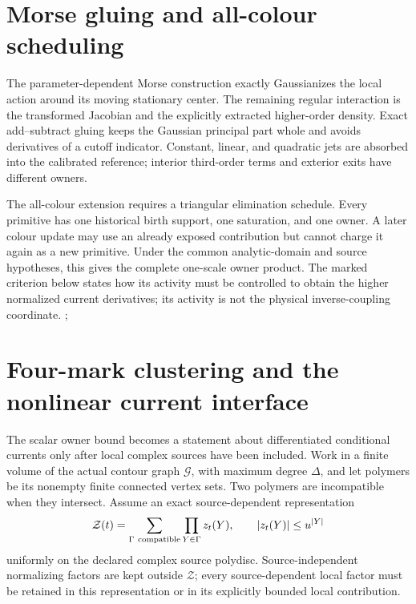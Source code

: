 \documentclass[11pt,oneside,openany]{book}
\theoremstyle{definition}
\theoremstyle{remark}
\newcommand{\src}[2]{\cite[#2]{#1}}
\begin{document}
\section{Morse gluing and all-colour scheduling}
The parameter-dependent Morse construction exactly Gaussianizes the local action around its moving stationary center. The remaining regular interaction is the transformed Jacobian and the explicitly extracted higher-order density. Exact add--subtract gluing keeps the Gaussian principal part whole and avoids derivatives of a cutoff indicator. Constant, linear, and quadratic jets are absorbed into the calibrated reference; interior third-order terms and exterior exits have different owners.

The all-colour extension requires a triangular elimination schedule.
Every primitive has one historical birth support, one saturation, and
one owner. A later colour update may use an already exposed contribution
but cannot charge it again as a new primitive. Under the common
analytic-domain and source hypotheses, this gives the complete one-scale
owner product. The marked criterion below states how its activity must
be controlled to obtain the higher normalized current derivatives; its
activity is not the physical inverse-coupling coordinate.
\src{F8}{V61--V65}; \src{F9}{V5--V8}

\section{Four-mark clustering and the nonlinear current interface}
\label{sec:four-mark-interface}
The scalar owner bound becomes a statement about differentiated
conditional currents only after local complex sources have been
included. Work in a finite volume of the actual contour graph
$\mathcal G$, with maximum degree $\Delta$, and let polymers be its nonempty finite connected
vertex sets. Two polymers are incompatible when they intersect. Assume
an exact source-dependent representation
\begin{equation}\label{eq:marked-polymer-partition}
\mathcal Z(t)=\sum_{\Gamma\ {\rm compatible}}
                 \prod_{Y\in\Gamma}z_t(Y),
\qquad |z_t(Y)|\le u^{|Y|}
\end{equation}
uniformly on the declared complex source polydisc. Source-independent
normalizing factors are kept outside $\mathcal Z$; every
source-dependent local factor must be retained in this representation
or in its explicitly bounded local contribution.
\end{document}
